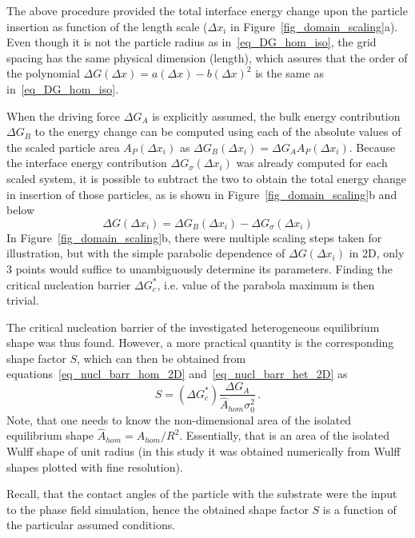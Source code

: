 The above procedure provided the total interface energy change upon the particle insertion as function of the length scale ($\Delta x_i$ in Figure~\ref{fig_domain_scaling}a). Even though it is not the particle radius as in~\eqref{eq_DG_hom_iso}, the grid spacing has the same physical dimension (length), which assures that the order of the polynomial $\Delta G(\Delta x) = a(\Delta x) - b(\Delta x)^2$ is the same as in~\eqref{eq_DG_hom_iso}.

When the driving force $\Delta G_A$ is explicitly assumed, the bulk energy contribution $\Delta G_B$ to the energy change can be computed using each of the absolute values of the scaled particle area $A_P(\Delta x_i)$ as $\Delta G_B(\Delta x_i)=\Delta G_A A_P(\Delta x_i)$. Because the interface energy contribution $\Delta G_\sigma(\Delta x_i)$ was already computed for each scaled system, it is possible to subtract the two to obtain the total energy change in insertion of those particles, as is shown in Figure~\ref{fig_domain_scaling}b and below
\begin{equation}
	\Delta G(\Delta x_i) = \Delta G_B(\Delta x_i) - \Delta G_\sigma(\Delta x_i)
\end{equation}
 In Figure~\ref{fig_domain_scaling}b, there were multiple scaling steps taken for illustration, but with the simple parabolic dependence of $\Delta G(\Delta x_i)$ in 2D, only 3 points would suffice to unambiguously determine its parameters. Finding the critical nucleation barrier $\Delta G^*_c$, i.e. value of the parabola maximum is then trivial. 

The critical nucleation barrier of the investigated heterogeneous equilibrium shape was thus found. However, a more practical quantity is the corresponding shape factor $S$, which can then be obtained from equations~\eqref{eq_nucl_barr_hom_2D} and~\eqref{eq_nucl_barr_het_2D} as
\begin{equation} \label{eq_NPA_PF_formula}
	S = (\Delta G_c^*)\frac{\Delta G_A}{\hat{A}_{hom}\sigma_0^2} \,.
\end{equation}
Note, that one needs to know the non-dimensional area of the isolated equilibrium shape $\hat{A}_{hom}=A_{hom}/R^2$. Essentially, that is an area of the isolated Wulff shape of unit radius (in this study it was obtained numerically from Wulff shapes plotted with fine resolution).

Recall, that the contact angles of the particle with the substrate were the input to the phase field simulation, hence the obtained shape factor $S$ is a function of the particular assumed conditions. 

